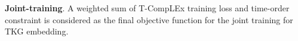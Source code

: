 \documentclass[11pt]{article}
\newcommand{\xhdr}[1]{{\noindent\bfseries #1}.}
\newcommand{\peng}[1]{{{\color{purple!60!blue}{[peng: #1]}}}}
\begin{document}
\xhdr{Joint-training} 
A weighted sum of T-CompLEx training loss and time-order constraint is considered as the final objective function for the joint training for TKG embedding.
\end{document}
